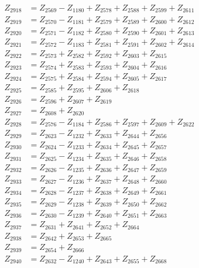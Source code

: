 \begin{multicols}{2}
\begin{align}
Z_{2918} &= Z_{2569} - Z_{1180} + Z_{2578} + Z_{2588} + Z_{2599} + Z_{2611} \nonumber \\
Z_{2919} &= Z_{2570} - Z_{1181} + Z_{2579} + Z_{2589} + Z_{2600} + Z_{2612} \nonumber \\
Z_{2920} &= Z_{2571} - Z_{1182} + Z_{2580} + Z_{2590} + Z_{2601} + Z_{2613} \nonumber \\
Z_{2921} &= Z_{2572} - Z_{1183} + Z_{2581} + Z_{2591} + Z_{2602} + Z_{2614} \nonumber \\
Z_{2922} &= Z_{2573} + Z_{2582} + Z_{2592} + Z_{2603} + Z_{2615} \nonumber \\
Z_{2923} &= Z_{2574} + Z_{2583} + Z_{2593} + Z_{2604} + Z_{2616} \nonumber \\
Z_{2924} &= Z_{2575} + Z_{2584} + Z_{2594} + Z_{2605} + Z_{2617} \nonumber \\
Z_{2925} &= Z_{2585} + Z_{2595} + Z_{2606} + Z_{2618} \nonumber \\
Z_{2926} &= Z_{2596} + Z_{2607} + Z_{2619} \nonumber \\
Z_{2927} &= Z_{2608} + Z_{2620} \nonumber \\
Z_{2928} &= Z_{2576} - Z_{1184} + Z_{2586} + Z_{2597} + Z_{2609} + Z_{2622} \nonumber \\
Z_{2929} &= Z_{2623} - Z_{1232} + Z_{2633} + Z_{2644} + Z_{2656} \nonumber \\
Z_{2930} &= Z_{2624} - Z_{1233} + Z_{2634} + Z_{2645} + Z_{2657} \nonumber \\
Z_{2931} &= Z_{2625} - Z_{1234} + Z_{2635} + Z_{2646} + Z_{2658} \nonumber \\
Z_{2932} &= Z_{2626} - Z_{1235} + Z_{2636} + Z_{2647} + Z_{2659} \nonumber \\
Z_{2933} &= Z_{2627} - Z_{1236} + Z_{2637} + Z_{2648} + Z_{2660} \nonumber \\
Z_{2934} &= Z_{2628} - Z_{1237} + Z_{2638} + Z_{2649} + Z_{2661} \nonumber \\
Z_{2935} &= Z_{2629} - Z_{1238} + Z_{2639} + Z_{2650} + Z_{2662} \nonumber \\
Z_{2936} &= Z_{2630} - Z_{1239} + Z_{2640} + Z_{2651} + Z_{2663} \nonumber \\
Z_{2937} &= Z_{2631} + Z_{2641} + Z_{2652} + Z_{2664} \nonumber \\
Z_{2938} &= Z_{2642} + Z_{2653} + Z_{2665} \nonumber \\
Z_{2939} &= Z_{2654} + Z_{2666} \nonumber \\
Z_{2940} &= Z_{2632} - Z_{1240} + Z_{2643} + Z_{2655} + Z_{2668} \nonumber \\

\end{align}
\end{multicols}
